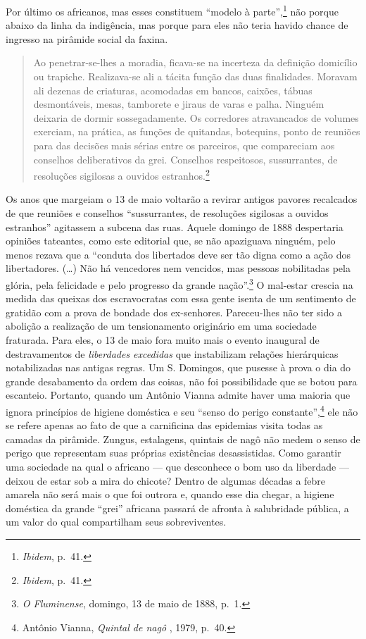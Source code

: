 Por último os africanos, mas esses constituem ``modelo à
parte'',\footnote{\textit{Ibidem}, p.~41.} não porque abaixo da linha da
indigência, mas porque para eles não teria havido chance de ingresso na
pirâmide social da faxina.

\begin{quote}
Ao penetrar-se-lhes a moradia, ficava-se na incerteza da definição
domicílio ou trapiche. Realizava-se ali a tácita função das duas
finalidades. Moravam ali dezenas de criaturas, acomodadas em bancos,
caixões, tábuas desmontáveis, mesas, tamborete e jiraus de varas e
palha. Ninguém deixaria de dormir sossegadamente. Os corredores
atravancados de volumes exerciam, na prática, as funções de quitandas,
botequins, ponto de reuniões para das decisões mais sérias entre os
parceiros, que compareciam aos conselhos deliberativos da grei.
Conselhos respeitosos, sussurrantes, de resoluções sigilosas a ouvidos
estranhos.\footnote{\textit{Ibidem}, p.~41.}
\end{quote}

Os anos que margeiam o 13 de maio voltarão a revirar antigos pavores
recalcados de que reuniões e conselhos ``sussurrantes, de resoluções
sigilosas a ouvidos estranhos'' agitassem a subcena das ruas. Aquele
domingo de 1888 despertaria opiniões tateantes, como este editorial que,
se não apaziguava ninguém, pelo menos rezava que a ``conduta dos
libertados deve ser tão digna como a ação dos libertadores. (\ldots{})
Não há vencedores nem vencidos, mas pessoas nobilitadas pela glória,
pela felicidade e pelo progresso da grande nação''.\footnote{\textit{O
  Fluminense}, domingo, 13 de maio de 1888, p.~1.} O mal-estar crescia
na medida das queixas dos escravocratas com essa gente isenta de um
sentimento de gratidão com a prova de bondade dos ex-senhores.
Pareceu-lhes não ter sido a abolição a realização de um tensionamento
originário em uma sociedade fraturada. Para eles, o 13 de maio fora
muito mais o evento inaugural de destravamentos de \textit{liberdades
excedidas} que instabilizam relações hierárquicas notabilizadas nas
antigas regras. Um S. Domingos, que pusesse à prova o dia do grande
desabamento da ordem das coisas, não foi possibilidade que se botou para
escanteio. Portanto, quando um Antônio Vianna admite haver uma maioria
que ignora princípios de higiene doméstica e seu ``senso do perigo
constante'',\footnote{Antônio Vianna, \textit{Quintal de nagô} , 1979,
  p.~40.} ele não se refere apenas ao fato de que a carnificina das
epidemias visita todas as camadas da pirâmide. Zungus, estalagens,
quintais de nagô não medem o senso de perigo que representam suas
próprias existências desassistidas. Como garantir uma sociedade na qual
o africano --- que desconhece o bom uso da liberdade --- deixou de estar
sob a mira do chicote? Dentro de algumas décadas a febre amarela não
será mais o que foi outrora e, quando esse dia chegar, a higiene
doméstica da grande ``grei'' africana passará de afronta à salubridade
pública, a um valor do qual compartilham seus sobreviventes.

